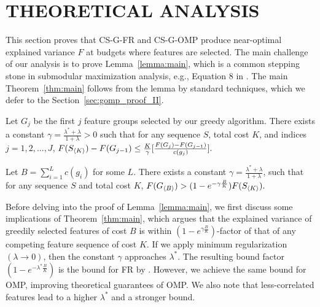 \section{THEORETICAL ANALYSIS}
\label{sec:gomp_proof}

This section proves that CS-G-FR and CS-G-OMP 
produce near-optimal explained variance $F$ at budgets 
where features are selected. The main challenge of our analysis is to prove Lemma~\ref{lemma:main},
which is a common stepping stone in 
submodular maximization analysis, e.g., Equation 8 in \citep{submodular}. The main Theorem~\ref{thm:main} follows from the lemma by standard techniques, which we defer to the Section~\ref{sec:gomp_proof_II}. 

\begin{lemma}[main]
  Let $G_j$ be the first $j$ feature groups selected by our greedy algorithm. There exists a constant $\gamma = \frac{\lambda^* + \lambda}{1 +\lambda} > 0$ such that for any sequence $S$, total cost $K$, and indices $j=1,2,..., J$, 
  \mbox{$
    F(S_{\langle K \rangle}) - F(G_{j-1}) \leq \frac{K}{\gamma}
      \lbrack \frac{F(G_j) - F(G_{j-1})}{c(g_j)} \rbrack.
  $}
  \label{lemma:main}
\end{lemma}


\begin{theorem}
Let $B = \sum _{i=1}^L c(g_i)$ for some $L$.  
There exists a constant  
  $\gamma = \frac{\lambda^* + \lambda}{1+\lambda}$, 
  such that
for any sequence $S$ and total cost $K$, 
\mbox{$
  F(G_{\langle B \rangle}) > (1 - e^{-\gamma\frac{B}{K}})F(S_{\langle K \rangle}).
$}
\label{thm:main}
\end{theorem}

%
Before delving into the proof of Lemma~\ref{lemma:main}, we first discuss 
some implications of Theorem~\ref{thm:main}, which 
argues that the explained variance of greedily selected
features of cost $B$ is within $(1-e^{\gamma \frac{B}{K}})$-factor
of that of any competing feature sequence of cost $K$.
If we apply minimum regularization $(\lambda \rightarrow 0)$, then 
the constant $\gamma$ approaches $\lambda^*$. The resulting bound factor $(1-e^{ - \lambda^* \frac{B}{K}})$ is the bound for FR by \cite{kemp}. However, we achieve the same bound for OMP, improving
theoretical guarantees of OMP. We also note that less-correlated features lead
to a higher $\lambda^*$  and a stronger bound. 


